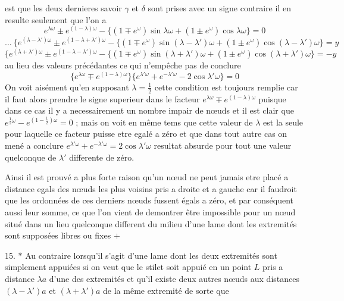 \documentclass[11pt,a4paper]{article}
\begin{document}
est que les deux dernieres savoir $\gamma$ et $\delta$ sont prises avec un
signe contraire il en resulte seulement que l'on a
\[ e^{\lambda\omega}\pm e^{(1-\lambda)\omega}-\{(1\mp e^{\omega})\sin\lambda\omega+(1\pm e^{\omega})\cos\lambda\omega\}=0 \]
\[ \ldots\ \{e^{(\lambda-\lambda')\omega}\pm e^{(1-\lambda+\lambda')\omega}-\{(1\mp e^{\omega})\sin(\lambda-\lambda')\omega+(1\pm e^{\omega})\cos(\lambda-\lambda')\omega\}=y \]
\[ \{e^{(\lambda+\lambda')\omega}\pm e^{(1-\lambda-\lambda')\omega}-\{(1\mp e^{\omega})\sin(\lambda+\lambda')\omega+(1\pm e^{\omega})\cos(\lambda+\lambda')\omega\}=-y \]
au lieu des valeurs précédantes ce qui n'empêche pas de conclure
\[ \{e^{\lambda\omega}\mp e^{(1-\lambda)\omega}\}\{e^{\lambda'\omega}+e^{-\lambda'\omega}-2\cos\lambda'\omega\}=0 \]
On voit aisément qu'en supposant $\lambda=\frac{1}{2}$ cette condition est
toujours remplie car il faut alors prendre le signe superieur dans le
facteur $e^{\lambda\omega}\mp e^{(1-\lambda)\omega}$ puisque dans ce cas il y a
necessairement un nombre impair de nœuds et il est clair que
$e^{\frac{1}{2}\omega}-e^{(1-\frac{1}{2})\omega}=0$ ; mais on voit en même tems
que cette valeur de $\lambda$ est la seule pour laquelle ce facteur puisse
etre egalé a zéro et que dans tout autre cas on mené a conclure
$e^{\lambda'\omega}+e^{-\lambda'\omega}=2\cos\lambda'\omega$ resultat absurde pour tout
une valeur quelconque de $\lambda'$ differente de zéro.

Ainsi il est prouvé a plus forte raison qu'un nœud ne peut jamais etre
placé a distance egals des nœuds les plus voisins pris a droite et a gauche
car il faudroit que les ordonnées  de ces derniers nœuds
fussent égals a zéro, et par conséquent aussi leur somme, ce que l'on vient
de demontrer être impossible pour un nœud situé dans un lieu quelconque
different du milieu d'une lame dont les extremités sont supposées libres ou
fixes $+$

15. $*$ Au contraire lorsqu'il s'agit d'une lame dont les deux extremités
sont simplement appuiées si on veut que le stilet soit appuié  en un point $L$ pris a distance $\lambda a$ d'une des extremités et
qu'il existe deux autres nœuds aux distances $(\lambda-\lambda')a$ et
$(\lambda+\lambda')a$ de la même extremité de sorte que 
\end{document}
